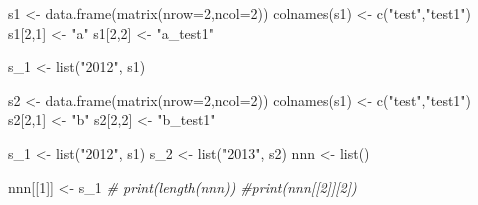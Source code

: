 \documentclass[
]{article}
\newenvironment{Shaded}{\begin{snugshade}}{\end{snugshade}}
\newcommand{\AttributeTok}[1]{\textcolor[rgb]{0.77,0.63,0.00}{#1}}
\newcommand{\CommentTok}[1]{\textcolor[rgb]{0.56,0.35,0.01}{\textit{#1}}}
\newcommand{\DecValTok}[1]{\textcolor[rgb]{0.00,0.00,0.81}{#1}}
\newcommand{\FunctionTok}[1]{\textcolor[rgb]{0.00,0.00,0.00}{#1}}
\newcommand{\NormalTok}[1]{#1}
\newcommand{\OtherTok}[1]{\textcolor[rgb]{0.56,0.35,0.01}{#1}}
\newcommand{\StringTok}[1]{\textcolor[rgb]{0.31,0.60,0.02}{#1}}
\begin{document}
\begin{Shaded}
\begin{Highlighting}[]
\NormalTok{s1 }\OtherTok{\textless{}{-}} \FunctionTok{data.frame}\NormalTok{(}\FunctionTok{matrix}\NormalTok{(}\AttributeTok{nrow=}\DecValTok{2}\NormalTok{,}\AttributeTok{ncol=}\DecValTok{2}\NormalTok{))}
\FunctionTok{colnames}\NormalTok{(s1) }\OtherTok{\textless{}{-}} \FunctionTok{c}\NormalTok{(}\StringTok{"test"}\NormalTok{,}\StringTok{"test1"}\NormalTok{)}
\NormalTok{s1[}\DecValTok{2}\NormalTok{,}\DecValTok{1}\NormalTok{] }\OtherTok{\textless{}{-}} \StringTok{"a"}
\NormalTok{s1[}\DecValTok{2}\NormalTok{,}\DecValTok{2}\NormalTok{] }\OtherTok{\textless{}{-}} \StringTok{"a\_test1"}

\NormalTok{s\_1 }\OtherTok{\textless{}{-}} \FunctionTok{list}\NormalTok{(}\StringTok{"2012"}\NormalTok{, s1)}

\NormalTok{s2 }\OtherTok{\textless{}{-}} \FunctionTok{data.frame}\NormalTok{(}\FunctionTok{matrix}\NormalTok{(}\AttributeTok{nrow=}\DecValTok{2}\NormalTok{,}\AttributeTok{ncol=}\DecValTok{2}\NormalTok{))}
\FunctionTok{colnames}\NormalTok{(s1) }\OtherTok{\textless{}{-}} \FunctionTok{c}\NormalTok{(}\StringTok{"test"}\NormalTok{,}\StringTok{"test1"}\NormalTok{)}
\NormalTok{s2[}\DecValTok{2}\NormalTok{,}\DecValTok{1}\NormalTok{] }\OtherTok{\textless{}{-}} \StringTok{"b"}
\NormalTok{s2[}\DecValTok{2}\NormalTok{,}\DecValTok{2}\NormalTok{] }\OtherTok{\textless{}{-}} \StringTok{"b\_test1"}


\NormalTok{s\_1 }\OtherTok{\textless{}{-}} \FunctionTok{list}\NormalTok{(}\StringTok{"2012"}\NormalTok{, s1)}
\NormalTok{s\_2 }\OtherTok{\textless{}{-}} \FunctionTok{list}\NormalTok{(}\StringTok{"2013"}\NormalTok{, s2)}
\NormalTok{nnn }\OtherTok{\textless{}{-}} \FunctionTok{list}\NormalTok{()}

\NormalTok{nnn[[}\DecValTok{1}\NormalTok{]] }\OtherTok{\textless{}{-}}\NormalTok{ s\_1}
\CommentTok{\# print(length(nnn))}
\CommentTok{\#print(nnn[[2]][2])}
\end{Highlighting}
\end{Shaded}
\end{document}
